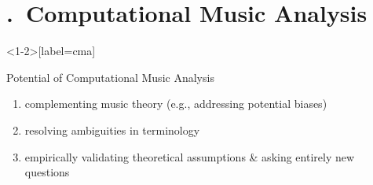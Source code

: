 \section{\thesection.~Computational Music Analysis}


\begin{frame}<1-2>[label=cma]{\insertsectionhead}

  Potential of Computational Music Analysis
  \begin{enumerate}
    \item<2-> complementing music theory (e.g., addressing potential biases)
    \item<3-> resolving ambiguities in terminology
    \item<4-> empirically validating theoretical assumptions \& asking entirely new questions
  \end{enumerate}




\end{frame}
